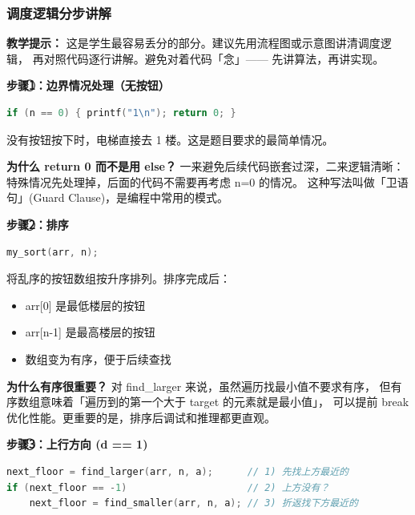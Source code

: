 \subsubsection{调度逻辑分步讲解}

\textbf{教学提示：} 这是学生最容易丢分的部分。建议先用流程图或示意图讲清调度逻辑，
再对照代码逐行讲解。避免对着代码「念」—— 先讲算法，再讲实现。

\vspace{0.5em}
\textbf{步骤\textcircled{1}：边界情况处理（无按钮）}

\begin{lstlisting}[language=C]
if (n == 0) { printf("1\n"); return 0; }
\end{lstlisting}

没有按钮按下时，电梯直接去 1 楼。这是题目要求的最简单情况。

\textbf{为什么 return 0 而不是用 else？}
一来避免后续代码嵌套过深，二来逻辑清晰：特殊情况先处理掉，后面的代码不需要再考虑 n=0 的情况。
这种写法叫做「卫语句」(Guard Clause)，是编程中常用的模式。

\vspace{0.5em}
\textbf{步骤\textcircled{2}：排序}

\begin{lstlisting}[language=C]
my_sort(arr, n);
\end{lstlisting}

将乱序的按钮数组按升序排列。排序完成后：
\begin{itemize}
    \item arr[0] 是最低楼层的按钮
    \item arr[n-1] 是最高楼层的按钮
    \item 数组变为有序，便于后续查找
\end{itemize}

\textbf{为什么有序很重要？} 对 find\_larger 来说，虽然遍历找最小值不要求有序，
但有序数组意味着「遍历到的第一个大于 target 的元素就是最小值」，
可以提前 break 优化性能。更重要的是，排序后调试和推理都更直观。

\vspace{0.5em}
\textbf{步骤\textcircled{3}：上行方向 (d == 1)}

\begin{lstlisting}[language=C]
next_floor = find_larger(arr, n, a);      // 1) 先找上方最近的
if (next_floor == -1)                     // 2) 上方没有？
    next_floor = find_smaller(arr, n, a); // 3) 折返找下方最近的
\end{lstlisting}

